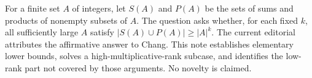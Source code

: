 For a finite set $A$ of integers, let $S(A)$ and $P(A)$ be the sets of sums and products of nonempty subsets of $A$. The question asks whether, for each fixed $k$, all sufficiently large $A$ satisfy $|S(A)\cup P(A)|\ge|A|^k$. The current editorial attributes the affirmative answer to Chang. This note establishes elementary lower bounds, solves a high-multiplicative-rank subcase, and identifies the low-rank part not covered by those arguments. No novelty is claimed.

